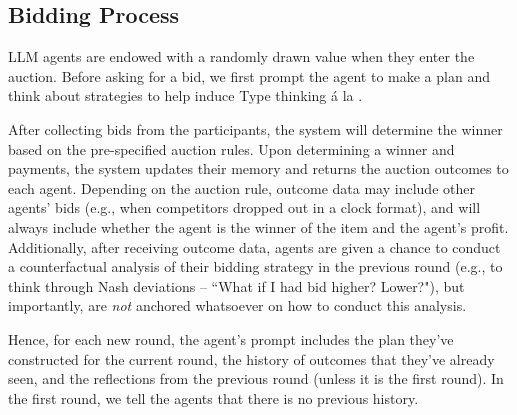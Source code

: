 \documentclass{article} %
\newcommand{\RNum}[1]{\uppercase\expandafter{\romannumeral #1\relax}}
\begin{document}
\subsection{Bidding Process}



LLM agents are endowed with a randomly drawn value when they enter the auction. Before asking for a bid, we first prompt the agent to make a plan and think about strategies to help induce Type \RNum{2} thinking \'a
 la \cite{kahneman2011thinking}.

After collecting bids from the participants, the system will determine the winner based on the pre-specified auction rules. 
Upon determining a winner and payments, the system updates their memory and returns the auction outcomes to each agent. Depending on the auction rule, outcome data may include other agents' bids (e.g., when competitors dropped out in a clock format), and will always include whether the agent is the winner of the item and the agent's profit. Additionally, after receiving outcome data, agents are given a chance to conduct a counterfactual analysis of their bidding strategy in the previous round (e.g., to think through Nash deviations -- ``What if I had bid higher? Lower?"), but importantly, are \textit{not} anchored whatsoever on how to conduct this analysis. 

Hence, for each new round, the agent's prompt includes the plan they've constructed for the current round, the history of outcomes that they've already seen, and the reflections from the previous round (unless it is the first round). In the first round, we tell the agents that there is no previous history. 
\end{document}
